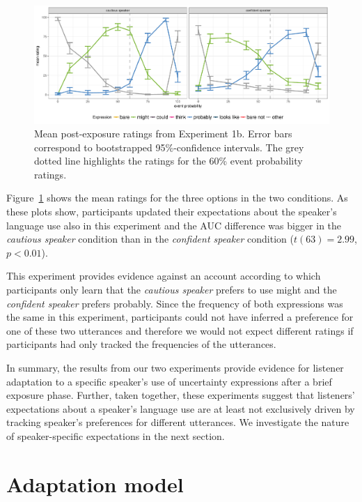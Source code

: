 \documentclass[lucida,biblatex]{sp} %
\begin{document}
\begin{figure}
\includegraphics[width=\textwidth]{plots/exp-1-replication-ratings.pdf}
\caption{Mean post-exposure ratings from Experiment 1b. Error bars correspond to bootstrapped 95\%-confidence intervals.  The grey dotted line highlights the ratings for the 60\% event probability ratings.  \label{fig:adaptation-results-prod2}}
\end{figure}

Figure~\ref{fig:adaptation-results-prod2} shows the mean ratings for the three options in the two conditions. As these plots show, participants updated their expectations about the speaker's language use also in this experiment and the
AUC difference was bigger in the \emph{cautious speaker} condition than in the \emph{confident speaker} condition ($t(63) = 2.99$, $p < 0.01$). 

This experiment provides evidence against an account according to which participants only learn that the \emph{cautious speaker} prefers to use {\sc might} and the {\it confident speaker} prefers {\sc probably}. 
Since the frequency of both expressions was the same in this experiment, participants could not have inferred a preference for one of these two utterances and therefore we would not expect different ratings if participants
had only tracked the frequencies of the utterances. 

In summary, the results from our two experiments provide evidence for listener adaptation to a specific speaker's use of uncertainty expressions after a brief exposure phase. Further, taken together, these experiments
suggest that listeners' expectations about a speaker's language use are at least not exclusively driven by tracking speaker's preferences for different utterances. We investigate the nature of speaker-specific expectations
in the next section.


% 

\section{Adaptation model}
\label{sec:model-adapt}
\end{document}
